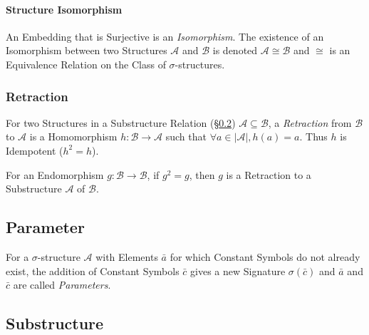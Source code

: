 \paragraph{Structure Isomorphism}\label{sec:structure_isomorphism}\hfill

An Embedding that is Surjective is an \emph{Isomorphism}. The
existence of an Isomorphism between two Structures $\mathcal{A}$ and
$\mathcal{B}$ is denoted $\mathcal{A} \cong \mathcal{B}$ and $\cong$
is an Equivalence Relation on the Class of $\sigma$-structures.



\subsubsection{Retraction}\label{sec:retraction}

For two Structures in a Substructure Relation
(\S\ref{sec:substructure}) $\mathcal{A} \subseteq \mathcal{B}$, a
\emph{Retraction} from $\mathcal{B}$ to $\mathcal{A}$ is a
Homomorphism $h : \mathcal{B} \rightarrow \mathcal{A}$ such that
$\forall a \in |\mathcal{A}|, h(a) = a$. Thus $h$ is Idempotent ($h^2
= h$).

For an Endomorphism $g : \mathcal{B} \rightarrow \mathcal{B}$, if $g^2
= g$, then $g$ is a Retraction to a Substructure $\mathcal{A}$ of
$\mathcal{B}$.



\subsection{Parameter}\label{sec:parameter}

For a $\sigma$-structure $\mathcal{A}$ with Elements $\bar{a}$ for
which Constant Symbols do not already exist, the addition of Constant
Symbols $\bar{c}$ gives a new Signature $\sigma(\bar{c})$ and
$\bar{a}$ and $\bar{c}$ are called \emph{Parameters}.



\subsection{Substructure}\label{sec:substructure}

